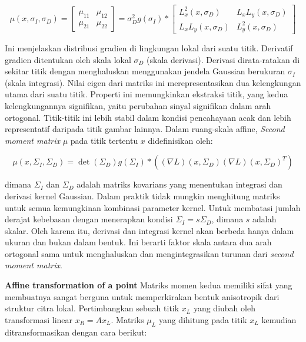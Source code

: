 \begin{equation}
  \mu(x,\sigma_{I},\sigma_{D})= 
  \begin{bmatrix}
   \mu_{11} & \mu_{12} \\
   \mu_{21} & \mu_{22} 
   \end{bmatrix} =
   \sigma^{2}_{D} g(\sigma_{I}) *
   \begin{bmatrix}
   L^{2}_{x}(x,\sigma_{D}) & L_{x}L_{y}(x,\sigma_{D}) \\
   L_{x}L_{y}(x,\sigma_{D}) & L^{2}_{y}(x,\sigma_{D}) 
   \end{bmatrix}
   \label{eq:autokorelasi}
\end{equation}

Ini menjelaskan distribusi gradien di lingkungan lokal dari suatu titik. Derivatif gradien ditentukan 
oleh skala lokal \(\sigma_{D}\) (skala derivasi). Derivasi dirata-ratakan di sekitar titik dengan 
menghaluskan menggunakan jendela Gaussian berukuran \(\sigma_{I}\) (skala integrasi).
Nilai eigen dari matriks ini merepresentasikan dua kelengkungan utama dari suatu titik. 
Properti ini memungkinkan ekstraksi titik, yang kedua kelengkungannya signifikan, yaitu perubahan 
sinyal signifikan dalam arah ortogonal. Titik-titik ini lebih stabil dalam kondisi pencahayaan acak 
dan lebih representatif daripada titik gambar lainnya.
Dalam ruang-skala affine, \emph{Second moment matrix} \(\mu\) pada titik tertentu \(x\) didefinisikan oleh:

\begin{equation*}
  \mu(x, \Sigma_{I}, \Sigma_{D} ) = \det(\Sigma_{D})g(\Sigma_{I})* ((\nabla L)(x, \Sigma_{D})(\nabla L)(x, \Sigma_{D})^{T})
\end{equation*}

dimana \(\Sigma_{I}\) dan \(\Sigma_{D}\) adalah matriks kovarians yang menentukan integrasi dan 
derivasi kernel Gaussian. Dalam praktik tidak mungkin menghitung matriks untuk semua kemungkinan 
kombinasi parameter kernel. Untuk membatasi jumlah derajat kebebasan dengan menerapkan 
kondisi \(\Sigma_{I} = s\Sigma_{D}\), dimana \(s\) adalah skalar. Oleh karena itu, derivasi dan integrasi 
kernel akan berbeda hanya dalam ukuran dan bukan dalam bentuk. Ini berarti faktor skala antara dua arah ortogonal 
sama untuk menghaluskan dan mengintegrasikan turunan dari \emph{second moment matrix}.

\textbf{Affine transformation of a point} Matriks momen kedua memiliki sifat yang membuatnya sangat berguna 
untuk memperkirakan bentuk anisotropik dari struktur citra lokal. Pertimbangkan sebuah titik \(x_{L}\) yang 
diubah oleh transformasi linear \(x_{R} = Ax_{L}\). Matriks \(\mu_{L}\) yang dihitung pada titik \(x_{L}\) 
kemudian ditransformasikan dengan cara berikut:

